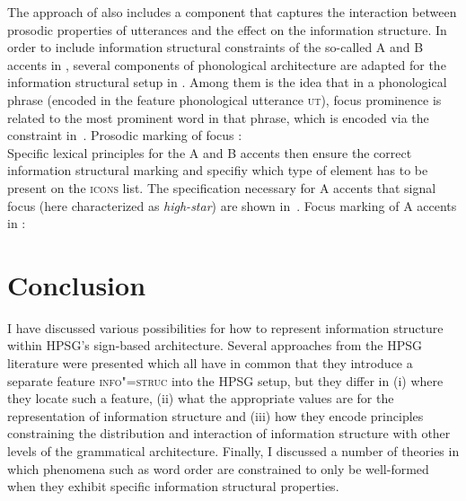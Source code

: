 \documentclass[output=paper
 	        ,biblatex
                ,babelshorthands
                ,newtxmath
                ,draftmode
                ,colorlinks, citecolor=brown
]{langscibook}
\begin{document}
The approach of \cite{song2018} also includes a component that
captures the interaction between prosodic properties of utterances and
the effect on the information structure. In order to include
information structural constraints of the so-called A and B accents in
, several components of  phonological
architecture are adapted for the information structural setup in
\cite{song2018}. Among them is the idea that in a phonological phrase
(encoded in the feature phonological utterance \textsc{ut}), focus
prominence is related to the most prominent word in that phrase, which
is encoded via the constraint in~.
\ea
\label{ex:song-mkg}
Prosodic marking of focus \citep[159]{song2018}:\\
\z
Specific lexical principles for the A and B accents then ensure the
correct information structural marking and specifiy which type of
element has to be present on the \textsc{icons} list. The
specification necessary for  A accents that signal focus (here characterized as
\textit{high-star}) are shown
in~.
\ea
\label{ex:song-a-accent}
Focus marking of A accents in  \citep[160]{song2018}:\\
 \impl
{}
\z

\section{Conclusion}
\label{sec:conclusion}

I have discussed various possibilities for how to represent
information structure within HPSG's sign-based architecture.
Several approaches from the HPSG literature were presented which all
have in common that they introduce a separate feature
\textsc{info"=struc} into the HPSG setup, but they differ in (i) where
they locate such a feature, (ii) what the appropriate values are for
the representation of information structure and (iii) how they encode
principles constraining the distribution and interaction of
information structure with other levels of the grammatical
architecture. Finally, I discussed a number of theories in which
phenomena such as word order are constrained to only be well-formed
when they exhibit specific information structural properties.
\end{document}
